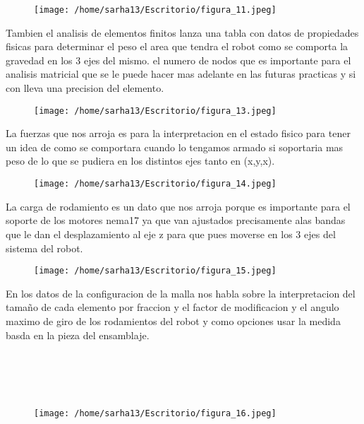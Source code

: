 \documentclass[letter,openright,12pt,spanish]{report}
\begin{document}
\begin{figure}[htp!]
\centering
\texttt{[image: /home/sarha13/Escritorio/figura\_11.jpeg]}
\caption{}
\label{Figura 7.}
\end{figure}

Tambien el analisis de elementos finitos lanza una tabla con datos de propiedades fisicas para determinar el peso el area que tendra el robot como se comporta la gravedad en los 3 ejes del mismo. el numero de nodos que es importante para el analisis matricial que se le puede hacer mas adelante en las futuras practicas y si con lleva una precision del elemento.

\begin{figure}[htp!]
\centering
\texttt{[image: /home/sarha13/Escritorio/figura\_13.jpeg]}
\caption{}
\label{Figura 7.}
\end{figure}

La fuerzas que nos arroja es para la interpretacion en el estado fisico para tener un idea de como se comportara cuando lo tengamos armado si soportaria mas peso de lo que se pudiera en los distintos ejes tanto en (x,y,x).

\begin{figure}[htp!]
\centering
\texttt{[image: /home/sarha13/Escritorio/figura\_14.jpeg]}
\caption{}
\label{Figura 7.}
\end{figure}

La carga de rodamiento es un dato que nos arroja porque es importante para el soporte de los motores nema17 ya que van ajustados precisamente alas bandas que le dan el desplazamiento al eje z para que pues moverse en los 3 ejes del sistema del robot.

\begin{figure}[htp!]
\centering
\texttt{[image: /home/sarha13/Escritorio/figura\_15.jpeg]}
\caption{}
\label{Figura 7.}
\end{figure}

En los datos de la configuracion de la malla nos habla sobre la interpretacion del tamaño de cada elemento por fraccion y el factor de modificacion y el angulo maximo de giro de los rodamientos del robot y como opciones usar la medida basda en la pieza del ensamblaje.\\\\\\\\\\

\begin{figure}[htp!]
\centering
\texttt{[image: /home/sarha13/Escritorio/figura\_16.jpeg]}
\caption{}
\label{Figura 7.}
\end{figure}
\end{document}
